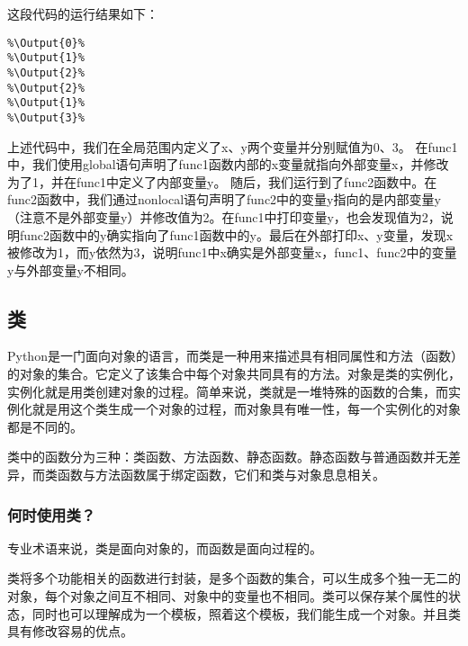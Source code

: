 这段代码的运行结果如下：
\begin{lstlisting}
%\Output{0}%
%\Output{1}%
%\Output{2}%
%\Output{2}%
%\Output{1}%
%\Output{3}%
\end{lstlisting}

上述代码中，我们在全局范围内定义了x、y两个变量并分别赋值为0、3。
在func1中，我们使用global语句声明了func1函数内部的x变量就指向外部变量x，并修改为了1，并在func1中定义了内部变量y。
随后，我们运行到了func2函数中。在func2函数中，我们通过nonlocal语句声明了func2中的变量y指向的是内部变量y（注意不是外部变量y）并修改值为2。在func1中打印变量y，也会发现值为2，说明func2函数中的y确实指向了func1函数中的y。最后在外部打印x、y变量，发现x被修改为1，而y依然为3，说明func1中x确实是外部变量x，func1、func2中的变量y与外部变量y不相同。

\subsection{类}
Python是一门面向对象的语言，而类是一种用来描述具有相同属性和方法（函数）的对象的集合。它定义了该集合中每个对象共同具有的方法。对象是类的实例化，实例化就是用类创建对象的过程。简单来说，类就是一堆特殊的函数的合集，而实例化就是用这个类生成一个对象的过程，而对象具有唯一性，每一个实例化的对象都是不同的。

类中的函数分为三种：类函数、方法函数、静态函数。静态函数与普通函数并无差异，而类函数与方法函数属于绑定函数，它们和类与对象息息相关。

\subsubsection{何时使用类？}
专业术语来说，类是面向对象的，而函数是面向过程的。

类将多个功能相关的函数进行封装，是多个函数的集合，可以生成多个独一无二的对象，每个对象之间互不相同、对象中的变量也不相同。类可以保存某个属性的状态，同时也可以理解成为一个模板，照着这个模板，我们能生成一个对象。并且类具有修改容易的优点。


